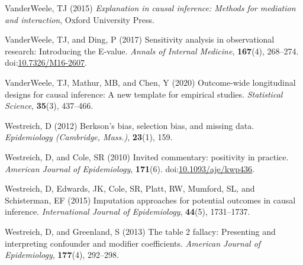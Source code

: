\documentclass[
  singlecolumn]{article}
\newlength{\cslhangindent}
\newenvironment{CSLReferences}[2] %
 {\begin{list}{}{%
  \setlength{\itemindent}{0pt}
  \setlength{\leftmargin}{0pt}
  \setlength{\parsep}{0pt}
  \ifodd #1
   \setlength{\leftmargin}{\cslhangindent}
   \setlength{\itemindent}{-1\cslhangindent}
  \fi
  \setlength{\itemsep}{#2\baselineskip}}}
 {\end{list}}
\begin{document}
\begin{CSLReferences}{1}{0}
VanderWeele, TJ (2015) \emph{Explanation in causal inference: Methods
for mediation and interaction}, Oxford University Press.

VanderWeele, TJ, and Ding, P (2017) Sensitivity analysis in
observational research: Introducing the {E}-value. \emph{Annals of
Internal Medicine}, \textbf{167}(4), 268--274.
doi:\href{https://doi.org/10.7326/M16-2607}{10.7326/M16-2607}.

VanderWeele, TJ, Mathur, MB, and Chen, Y (2020) Outcome-wide
longitudinal designs for causal inference: A new template for empirical
studies. \emph{Statistical Science}, \textbf{35}(3), 437--466.

Westreich, D (2012) Berkson's bias, selection bias, and missing data.
\emph{Epidemiology (Cambridge, Mass.)}, \textbf{23}(1), 159.

Westreich, D, and Cole, SR (2010) Invited commentary: positivity in
practice. \emph{American Journal of Epidemiology}, \textbf{171}(6).
doi:\href{https://doi.org/10.1093/aje/kwp436}{10.1093/aje/kwp436}.

Westreich, D, Edwards, JK, Cole, SR, Platt, RW, Mumford, SL, and
Schisterman, EF (2015) Imputation approaches for potential outcomes in
causal inference. \emph{International Journal of Epidemiology},
\textbf{44}(5), 1731--1737.

Westreich, D, and Greenland, S (2013) The table 2 fallacy: Presenting
and interpreting confounder and modifier coefficients. \emph{American
Journal of Epidemiology}, \textbf{177}(4), 292--298.

\end{CSLReferences}
\end{document}
